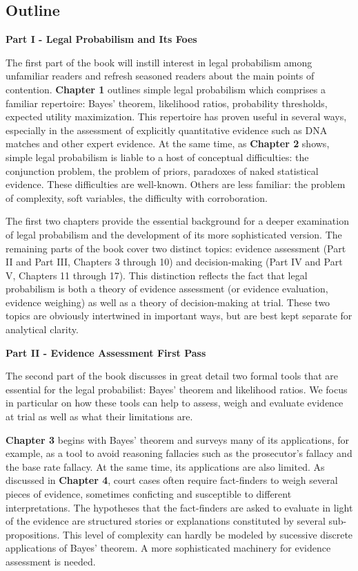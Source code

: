 \documentclass[10pt,dvipsnames,enabledeprecatedfontcommands]{scrartcl}
\begin{document}
\subsection{Outline}\label{outline}

\noindent
\textbf{Part I - Legal Probabilism and Its Foes}

\noindent
The first part of the book will instill interest in legal probabilism
among unfamiliar readers and refresh seasoned readers about the main
points of contention. \textbf{Chapter 1} outlines simple legal
probabilism which comprises a familiar repertoire: Bayes' theorem,
likelihood ratios, probability thresholds, expected utility
maximization. This repertoire has proven useful in several ways,
especially in the assessment of explicitly quantitative evidence such as
DNA matches and other expert evidence. At the same time, as
\textbf{Chapter 2} shows, simple legal probabilism is liable to a host
of conceptual difficulties: the conjunction problem, the problem of
priors, paradoxes of naked statistical evidence. These difficulties are
well-known. Others are less familiar: the problem of complexity, soft
variables, the difficulty with corroboration.

The first two chapters provide the essential background for a deeper
examination of legal probabilism and the development of its more
sophisticated version. The remaining parts of the book cover two
distinct topics: evidence assessment (Part II and Part III, Chapters 3
through 10) and decision-making (Part IV and Part V, Chapters 11 through
17). This distinction reflects the fact that legal probabilism is both a
theory of evidence assessment (or evidence evaluation, evidence
weighing) as well as a theory of decision-making at trial. These two
topics are obviously intertwined in important ways, but are best kept
separate for analytical clarity.

\vspace{3mm} \noindent
\textbf{Part II - Evidence Assessment First Pass}

\noindent
The second part of the book discusses in great detail two formal tools
that are essential for the legal probabilist: Bayes' theorem and
likelihood ratios. We focus in particular on how these tools can help to
assess, weigh and evaluate evidence at trial as well as what their
limitations are.

\textbf{Chapter 3} begins with Bayes' theorem and surveys many of its
applications, for example, as a tool to avoid reasoning fallacies such
as the prosecutor's fallacy and the base rate fallacy. At the same time,
its applications are also limited. As discussed in \textbf{Chapter 4},
court cases often require fact-finders to weigh several pieces of
evidence, sometimes conficting and susceptible to different
interpretations. The hypotheses that the fact-finders are asked to
evaluate in light of the evidence are structured stories or explanations
constituted by several sub-propositions. This level of complexity can
hardly be modeled by sucessive discrete applications of Bayes' theorem.
A more sophisticated machinery for evidence assessment is needed.
\end{document}
